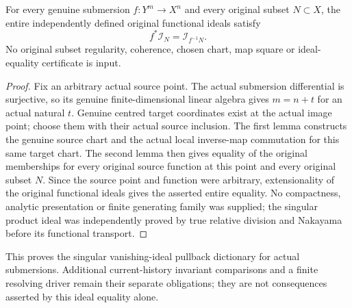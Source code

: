 \begin{theorem}
\label{hir:actual-singular-vanishing-ideal-pullback-submersion}
\leanok
For every genuine submersion $f:Y^m\to X^n$ and every original subset
$N\subset X$, the entire independently defined original functional
ideals satisfy
\[
 f^*\mathcal I_N=\mathcal I_{f^{-1}N}.
\]
No original subset regularity, coherence, chosen chart, map square or
ideal-equality certificate is input.
\end{theorem}
\begin{proof}
Fix an arbitrary actual source point. The actual submersion differential
is surjective, so its genuine finite-dimensional linear algebra gives
$m=n+t$ for an actual natural $t$. Genuine centred target coordinates
exist at the actual image point; choose them with their actual source
inclusion. The first lemma constructs the genuine source chart and the
actual local inverse-map commutation for this same target chart. The
second lemma then gives equality of the original memberships for every
original source function at this point and every original subset $N$.
Since the source point and function were arbitrary, extensionality of
the original functional ideals gives the asserted entire equality.
No compactness, analytic presentation or finite generating family was
supplied; the singular product ideal was independently proved by true
relative division and Nakayama before its functional transport.
\end{proof}

This proves the singular vanishing-ideal pullback dictionary for actual
submersions. Additional current-history invariant comparisons and a
finite resolving driver remain their separate obligations; they are
not consequences asserted by this ideal equality alone.
